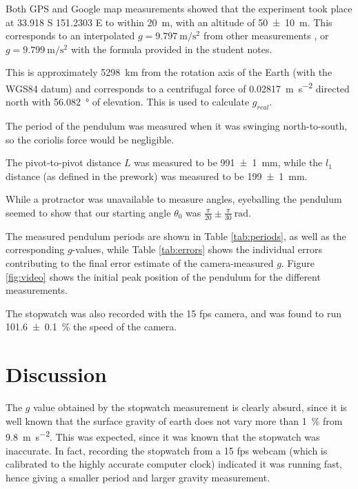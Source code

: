 \documentclass[a4paper]{scrartcl}
\begin{document}
Both GPS and Google map measurements showed that the experiment took place at 33.918 S 151.2303 E to within \SI{20}{\metre}, with an altitude of \SI{50 \pm 10}{\metre}. This corresponds to an interpolated \(g = \SI{9.797}{\metre\per\second\squared}\) from other measurements \cite{BGI2016}, or \(g = \SI{9.799}{\metre\per\second\squared}\) with the formula provided in the student notes.

This is approximately \SI{5298}{\kilo\metre} from the rotation axis of the Earth (with the WGS84 datum) and corresponds to a centrifugal force of \SI{0.02817}{\metre\per\second\squared} directed north with \SI{56.082}{\degree} of elevation. This is used to calculate \(g_{real}\).

The period of the pendulum was measured when it was swinging north-to-south, so the coriolis force would be negligible.

The pivot-to-pivot distance \(L\) was measured to be \SI{991 \pm 1}{\milli\metre}, while the \(l_1\) distance (as defined in the prework) was measured to be \SI{199 \pm 1}{\milli\metre}.

While a protractor was unavailable to measure angles, eyeballing the pendulum seemed to show that our starting angle \(\theta_0\) was \(\frac{\pi}{20} \pm \frac{\pi}{30} \:\si{\radian}\).

The measured pendulum periods are shown in Table \ref{tab:periods}, as well as the corresponding \(g\)-values, while Table \ref{tab:errors} shows the individual errors contributing to the final error estimate of the camera-measured \(g\). Figure \ref{fig:video} shows the initial peak position of the pendulum for the different measurements.

The stopwatch was also recorded with the 15 fps camera, and was found to run \SI{101.6 \pm 0.1}{\percent} the speed of the camera.

\section{Discussion}
The \(g\) value obtained by the stopwatch measurement is clearly absurd, since it is well known that the surface gravity of earth does not vary more than \SI{1}{\percent} from \SI{9.8}{\metre\per\second\squared}. This was expected, since it was known that the stopwatch was inaccurate. In fact, recording the stopwatch from a 15 fps webcam (which is calibrated to the highly accurate computer clock) indicated it was running fast, hence giving a smaller period and larger gravity measurement.
\end{document}
